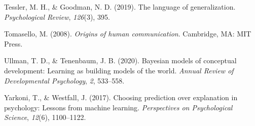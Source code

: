 \documentclass[
  man,floatsintext]{apa6}
\newlength{\cslhangindent}
\newlength{\cslentryspacingunit} %
\newenvironment{CSLReferences}[2] %
 {%
  \setlength{\parindent}{0pt}
  \ifodd #1
  \let\oldpar\par
  \def\par{\hangindent=\cslhangindent\oldpar}
  \fi
  \setlength{\parskip}{#2\cslentryspacingunit}
 }%
 {}
\begin{document}
\begin{CSLReferences}{1}{0}
\leavevmode{}%
Tessler, M. H., \& Goodman, N. D. (2019). The language of generalization. \emph{Psychological Review}, \emph{126}(3), 395.

\leavevmode{}%
Tomasello, M. (2008). \emph{Origins of human communication}. Cambridge, MA: MIT Press.

\leavevmode{}%
Ullman, T. D., \& Tenenbaum, J. B. (2020). Bayesian models of conceptual development: Learning as building models of the world. \emph{Annual Review of Developmental Psychology}, \emph{2}, 533--558.

\leavevmode{}%
Yarkoni, T., \& Westfall, J. (2017). Choosing prediction over explanation in psychology: Lessons from machine learning. \emph{Perspectives on Psychological Science}, \emph{12}(6), 1100--1122.

\end{CSLReferences}

\endgroup
\end{document}
